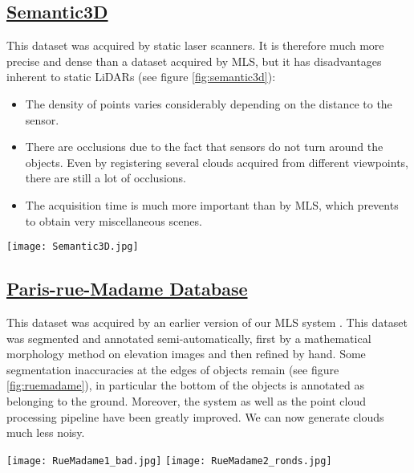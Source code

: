 \documentclass[a4paper, 10pt, journal]{article}
\begin{document}
\subsection{\href{http://www.semantic3d.net/}{Semantic3D} \cite{hackel2016fast}}\label{subsec:semantic3d}
This dataset was acquired by static laser scanners. It is therefore much more precise and dense than a dataset acquired by MLS, but it has disadvantages inherent to static LiDARs (see figure \ref{fig:semantic3d}):
\begin{itemize}
 \item The density of points varies considerably depending on the distance to the sensor.
 \item There are occlusions due to the fact that sensors do not turn around the objects. Even by registering several clouds acquired from different viewpoints, there are still a lot of occlusions.
 \item The acquisition time is much more important than by MLS, which prevents to obtain very miscellaneous scenes.
\end{itemize}

\begin{center}
 \texttt{[image: Semantic3D.jpg]}
\end{center}


\subsection{\href{http://cmm.ensmp.fr/~serna/rueMadameDataset.html}{Paris-rue-Madame Database} \cite{serna2014paris}}\label{subsec:ruemadame}
This dataset was acquired by an earlier version of our MLS system \cite{goulette2006integrated}. 
This dataset was segmented and annotated semi-automatically, first by a mathematical morphology method on elevation images \cite{serna2014paris} and then refined by hand. Some segmentation inaccuracies at the edges of objects remain (see figure \ref{fig:ruemadame}), in particular the bottom of the objects is annotated as belonging to the ground.
Moreover, the system as well as the point cloud processing pipeline have been greatly improved. We can now generate clouds much less noisy.

\begin{center}\centering
 \texttt{[image: RueMadame1\_bad.jpg]}\vspace{0.1cm}
 \texttt{[image: RueMadame2\_ronds.jpg]}
\end{center}
\end{document}

